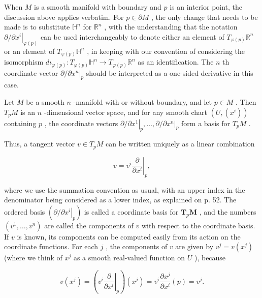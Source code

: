 \begin{definition}
When $M$ is a smooth manifold with boundary and $p$ is an interior point, the discussion above applies verbatim. For $p \in  \partial M$ , the only change that needs to be made is to substitute ${\mathbb{H}}^{n}$ for ${\mathbb{R}}^{n}$ , with the understanding that the notation $\partial /{\left. \partial {x}^{i}\right| }_{\varphi \left( p\right) }$ can be used interchangeably to denote either an element of ${T}_{\varphi \left( p\right) }{\mathbb{R}}^{n}$ or an element of ${T}_{\varphi \left( p\right) }{\mathbb{H}}^{n}$ , in keeping with our convention of considering the isomorphism $d{\iota }_{\varphi \left( p\right) } : {T}_{\varphi \left( p\right) }{\mathbb{H}}^{n} \rightarrow  {T}_{\varphi \left( p\right) }{\mathbb{R}}^{n}$ as an identification. The $n$ th coordinate vector $\partial /{\left. \partial {x}^{n}\right| }_{p}$ should be interpreted as a one-sided derivative in this case.
\end{definition}

\begin{proposition}
\label{prop:3-15}
\leanok
{}
Let $M$ be a smooth $n$ -manifold with or without boundary, and let $p \in  M$ . Then ${T}_{p}M$ is an $n$ -dimensional vector space, and for any smooth chart $\left( {U,\left( {x}^{i}\right) }\right)$ containing $p$ , the coordinate vectors $\partial /{\left. \partial {x}^{1}\right| }_{p},\ldots ,\partial /{\left. \partial {x}^{n}\right| }_{p}$ form a basis for ${T}_{p}M$ .
\end{proposition}

\begin{definition}
\label{def:3-15-extra-2}
\leanok
Thus, a tangent vector $v \in  {T}_{p}M$ can be written uniquely as a linear combination

\[
v = {\left. {v}^{i}\frac{\partial }{\partial {x}^{i}}\right| }_{p},
\]

where we use the summation convention as usual, with an upper index in the denominator being considered as a lower index, as explained on p. 52. The ordered basis $\left( {\left. \partial /\partial {x}^{i}\right| }_{p}\right)$ is called a coordinate basis for ${\mathbf{T}}_{p}\mathbf{M}$ , and the numbers $\left( {{v}^{1},\ldots ,{v}^{n}}\right)$ are called the components of $v$ with respect to the coordinate basis. If $v$ is known, its components can be computed easily from its action on the coordinate functions. For each $j$ , the components of $v$ are given by ${v}^{j} = v\left( {x}^{j}\right)$ (where we think of ${x}^{j}$ as a smooth real-valued function on $U$ ), because

\[
v\left( {x}^{j}\right)  = \left( {\left. {v}^{i}\frac{\partial }{\partial {x}^{i}}\right| }_{p}\right) \left( {x}^{j}\right)  = {v}^{i}\frac{\partial {x}^{j}}{\partial {x}^{i}}\left( p\right)  = {v}^{j}.
\]
\end{definition}


